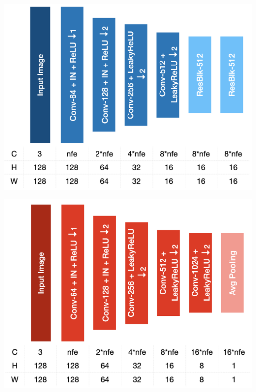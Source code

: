 \documentclass{article}
\newenvironment{Figure}
  {\par\medskip\noindent\minipage{\linewidth}}
  {\endminipage\par\medskip}
\begin{document}
\begin{multicols}{2}
\begin{Figure}
	\centering 
	\includegraphics[width=\linewidth]{figures/content_encoder.png}
	\label{fig:content_encoder}
\end{Figure}


\begin{Figure}
	\centering 
	\includegraphics[width=\linewidth]{figures/class_encoder.png}
	\label{fig:class_encoder}
\end{Figure}

\paragraph{}


\end{multicols}
\end{document}
